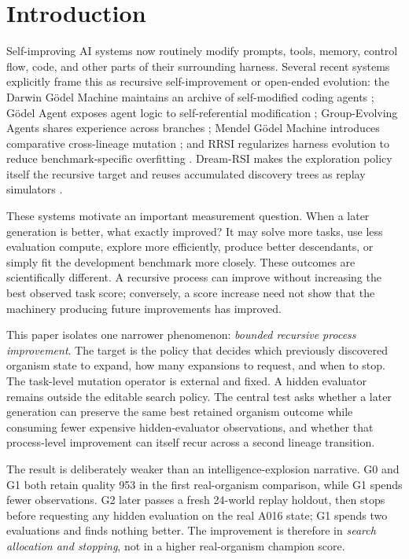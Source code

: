 \section{Introduction}

Self-improving AI systems now routinely modify prompts, tools, memory, control flow, code, and other parts of their surrounding harness. Several recent systems explicitly frame this as recursive self-improvement or open-ended evolution: the Darwin G\"odel Machine maintains an archive of self-modified coding agents \cite{zhang2025dgm}; G\"odel Agent exposes agent logic to self-referential modification \cite{yin2024godelagent}; Group-Evolving Agents shares experience across branches \cite{weng2026gea}; Mendel G\"odel Machine introduces comparative cross-lineage mutation \cite{liu2026mgm}; and RRSI regularizes harness evolution to reduce benchmark-specific overfitting \cite{xia2026rrsi}. Dream-RSI makes the exploration policy itself the recursive target and reuses accumulated discovery trees as replay simulators \cite{zheng2026dreamrsi}.

These systems motivate an important measurement question. When a later generation is better, what exactly improved? It may solve more tasks, use less evaluation compute, explore more efficiently, produce better descendants, or simply fit the development benchmark more closely. These outcomes are scientifically different. A recursive process can improve without increasing the best observed task score; conversely, a score increase need not show that the machinery producing future improvements has improved.

This paper isolates one narrower phenomenon: \emph{bounded recursive process improvement}. The target is the policy that decides which previously discovered organism state to expand, how many expansions to request, and when to stop. The task-level mutation operator is external and fixed. A hidden evaluator remains outside the editable search policy. The central test asks whether a later generation can preserve the same best retained organism outcome while consuming fewer expensive hidden-evaluator observations, and whether that process-level improvement can itself recur across a second lineage transition.

The result is deliberately weaker than an intelligence-explosion narrative. G0 and G1 both retain quality 953 in the first real-organism comparison, while G1 spends fewer observations. G2 later passes a fresh 24-world replay holdout, then stops before requesting any hidden evaluation on the real A016 state; G1 spends two evaluations and finds nothing better. The improvement is therefore in \emph{search allocation and stopping}, not in a higher real-organism champion score.

